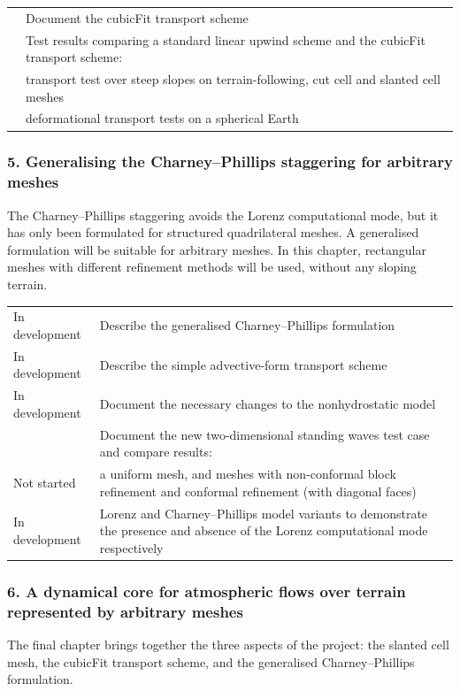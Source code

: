 \documentclass[a4paper,11pt]{article}
\begin{document}
\begin{tabularx}{\linewidth}{>{\hsize=1.3in}X X}
	\citet{shaw2017} & Document the cubicFit transport scheme \\
\addlinespace[0.5em]
	 & Test results comparing a standard linear upwind scheme and the cubicFit transport scheme: \\
	\citet{shaw2017} & \quad\textbullet\enspace transport test over steep slopes on terrain-following, cut cell and slanted cell meshes \\
	\citet{shaw2017} & \quad\textbullet\enspace deformational transport tests on a spherical Earth \\
\end{tabularx}

\subsubsection*{5. Generalising the Charney--Phillips staggering for arbitrary meshes}
\noindent The Charney--Phillips staggering avoids the Lorenz computational mode, but it has only been formulated for structured quadrilateral meshes.  A generalised formulation will be suitable for arbitrary meshes.  In this chapter, rectangular meshes with different refinement methods will be used, without any sloping terrain.
\vspace*{0.5em}

\begin{tabularx}{\linewidth}{>{\hsize=1.3in}X X}
	In development & Describe the generalised Charney--Phillips formulation \\
	In development & Describe the simple advective-form transport scheme \\
	In development & Document the necessary changes to the nonhydrostatic model \\
\addlinespace[0.5em]
&  Document the new two-dimensional standing waves test case and compare results: \\
\addlinespace[0.2em]
	Not started & \quad\textbullet\enspace a uniform mesh, and meshes with non-conformal block refinement and conformal refinement (with diagonal faces) \\
\addlinespace[0.2em]
	In development & \quad\textbullet\enspace Lorenz and Charney--Phillips model variants to demonstrate the presence and absence of the Lorenz computational mode respectively \\
\end{tabularx}

\subsubsection*{6. A dynamical core for atmospheric flows over terrain represented by arbitrary meshes}
\noindent The final chapter brings together the three aspects of the project: the slanted cell mesh, the cubicFit transport scheme, and the generalised Charney--Phillips formulation.
\vspace*{0.5em}
\end{document}
